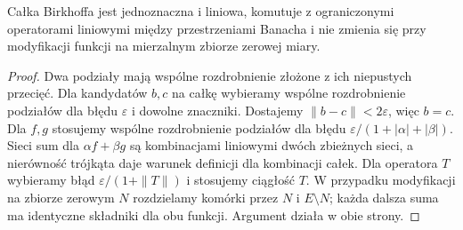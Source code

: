 \begin{twierdzenie}
\label{thm:birkhoff-basic-30}
Całka Birkhoffa jest jednoznaczna i liniowa,
komutuje z ograniczonymi operatorami liniowymi między
przestrzeniami Banacha i nie zmienia się przy modyfikacji
funkcji na mierzalnym zbiorze zerowej miary.
\end{twierdzenie}
\begin{proof}
Dwa podziały mają wspólne rozdrobnienie złożone
z ich niepustych przecięć. Dla kandydatów $b,c$
na całkę wybieramy wspólne rozdrobnienie podziałów
dla błędu $\varepsilon$ i dowolne znaczniki.
Dostajemy $\|b-c\|<2\varepsilon$, więc $b=c$.
Dla $f,g$ stosujemy wspólne rozdrobnienie podziałów
dla błędu $\varepsilon/(1+|\alpha|+|\beta|)$.
Sieci sum dla $\alpha f+\beta g$ są kombinacjami
liniowymi dwóch zbieżnych sieci, a nierówność
trójkąta daje warunek definicji dla kombinacji całek.
Dla operatora $T$ wybieramy błąd
$\varepsilon/(1+\|T\|)$ i stosujemy ciągłość $T$.
W przypadku modyfikacji na zbiorze zerowym $N$
rozdzielamy komórki przez $N$ i $E\setminus N$;
każda dalsza suma ma identyczne składniki dla obu
funkcji. Argument działa w obie strony.
\end{proof}

